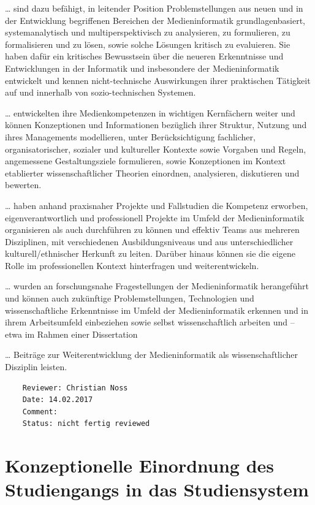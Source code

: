 \ldots{} sind dazu befähigt, in leitender Position Problemstellungen aus
neuen und in der Entwicklung begriffenen Bereichen der Medieninformatik
grundlagenbasiert, systemanalytisch und multiperspektivisch zu
analysieren, zu formulieren, zu formalisieren und zu lösen, sowie solche
Lösungen kritisch zu evaluieren. Sie haben dafür ein kritisches
Bewusstsein über die neueren Erkenntnisse und Entwicklungen in der
Informatik und insbesondere der Medieninformatik entwickelt und kennen
nicht-technische Auswirkungen ihrer praktischen Tätigkeit auf und
innerhalb von sozio-technischen Systemen.

\ldots{} entwickelten ihre Medienkompetenzen in wichtigen Kernfächern
weiter und können Konzeptionen und Informationen bezüglich ihrer
Struktur, Nutzung und ihres Managements modellieren, unter
Berücksichtigung fachlicher, organisatorischer, sozialer und kultureller
Kontexte sowie Vorgaben und Regeln, angemessene Gestaltungsziele
formulieren, sowie Konzeptionen im Kontext etablierter
wissenschaftlicher Theorien einordnen, analysieren, diskutieren und
bewerten.

\ldots{} haben anhand praxisnaher Projekte und Fallstudien die Kompetenz
erworben, eigenverantwortlich und professionell Projekte im Umfeld der
Medieninformatik organisieren als auch durchführen zu können und
effektiv Teams aus mehreren Disziplinen, mit verschiedenen
Ausbildungsniveaus und aus unterschiedlicher kulturell/ethnischer
Herkunft zu leiten. Darüber hinaus können sie die eigene Rolle im
professionellen Kontext hinterfragen und weiterentwickeln.

\ldots{} wurden an forschungsnahe Fragestellungen der Medieninformatik
herangeführt und können auch zukünftige Problemstellungen, Technologien
und wissenschaftliche Erkenntnisse im Umfeld der Medieninformatik
erkennen und in ihrem Arbeitsumfeld einbeziehen sowie selbst
wissenschaftlich arbeiten und -- etwa im Rahmen einer Dissertation

\ldots{} Beiträge zur Weiterentwicklung der Medieninformatik als
wissenschaftlicher Disziplin leisten.

\begin{verbatim}
    Reviewer: Christian Noss
    Date: 14.02.2017
    Comment: 
    Status: nicht fertig reviewed
\end{verbatim}

\chapter{Konzeptionelle Einordnung des Studiengangs in das
Studiensystem}\label{konzeptionelle-einordnung-des-studiengangs-in-das-studiensystem}

